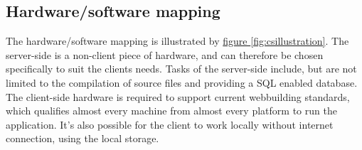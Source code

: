 \documentclass{report}
\begin{document}
		\subsection{Hardware/software mapping}
			The hardware/software mapping is illustrated by \hyperref[fig:csillustration]{figure \ref*{fig:csillustration}}. The server-side is a non-client piece of hardware, and can therefore be chosen specifically to suit the clients needs. Tasks of the server-side include, but are not limited to the compilation of source files and providing a SQL enabled database. The client-side hardware is required to support current webbuilding standards, which qualifies almost every machine from almost every platform to run the application. It's also possible for the client to work locally without internet connection, using the local storage.\\
\end{document}
